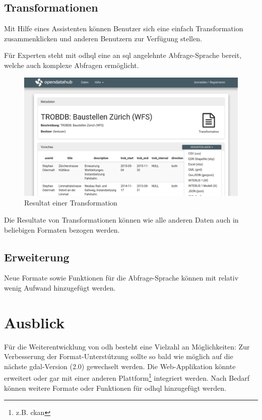 \subsection*{Transformationen}
Mit Hilfe eines Assistenten können Benutzer sich eine einfach Transformation zusammenklicken und anderen Benutzern zur Verfügung stellen. 

Für Experten steht mit \gls{odhql} eine an \gls{sql} angelehnte Abfrage-Sprache bereit, welche auch komplexe Abfragen ermöglicht.

\begin{figure}[H]
    \centering
    \includegraphics[width=2\linewidth/3]{fig/transformation-detail}
    \caption*{Resultat einer Transformation}
\end{figure}

Die Resultate von Transformationen können wie alle anderen Daten auch in beliebigen Formaten bezogen werden.

\subsection*{Erweiterung}
Neue Formate sowie Funktionen für die Abfrage-Sprache können mit relativ wenig Aufwand hinzugefügt werden.

\section*{Ausblick}
Für die Weiterentwicklung von \acs{odh} besteht eine Vielzahl an Möglichkeiten:
Zur Verbesserung der Format-Unterstútzung sollte so bald wie möglich auf die nächste \gls{gdal}-Version (2.0) gewechselt werden. 
Die Web-Applikation könnte erweitert oder gar mit einer anderen Plattform\footnote{z.B. \gls{ckan}} integriert werden.
Nach Bedarf können weitere Formate oder Funktionen für \gls{odhql} hinzugefügt werden.